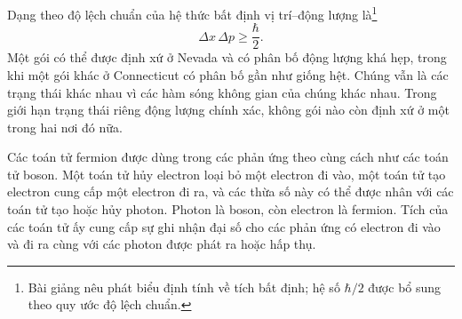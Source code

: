\begin{classroomqa}
\end{classroomqa}

Dạng theo độ lệch chuẩn của hệ thức bất định vị trí--động lượng là\footnote{Bài giảng nêu phát biểu định tính về tích bất định; hệ số \(\hbar/2\) được bổ sung theo quy ước độ lệch chuẩn.}
\begin{equation}
\Delta x\,\Delta p\geq\frac{\hbar}{2}.
\end{equation}
Một gói có thể được định xứ ở Nevada và có phân bố động lượng khá hẹp, trong khi một gói khác ở Connecticut có phân bố gần như giống hệt. Chúng vẫn là các trạng thái khác nhau vì các hàm sóng không gian của chúng khác nhau. Trong giới hạn trạng thái riêng động lượng chính xác, không gói nào còn định xứ ở một trong hai nơi đó nữa.

Các toán tử fermion được dùng trong các phản ứng theo cùng cách như các toán tử boson. Một toán tử hủy electron loại bỏ một electron đi vào, một toán tử tạo electron cung cấp một electron đi ra, và các thừa số này có thể được nhân với các toán tử tạo hoặc hủy photon. Photon là boson, còn electron là fermion. Tích của các toán tử ấy cung cấp sự ghi nhận đại số cho các phản ứng có electron đi vào và đi ra cùng với các photon được phát ra hoặc hấp thụ.

\begin{classroomqa}
\end{classroomqa}


